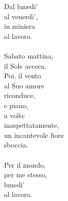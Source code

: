 \begin{haiku}
Dal lunedi' \\
al venerdi',\\
in miniera\\
al lavoro.\\
\leavevmode\\
Sabato mattina,\\
il Sole acceca.\\
Poi, il vento\\
al Suo amore\\
riconduce,\\
e piano,\\
a volte\\
inaspettatamente,\\
un incantevole fiore\\
sboccia.\\
\leavevmode\\
Per il mondo,\\
per me stesso,\\
lunedi'\\
al lavoro.\\
\end{haiku}
\restoregeometry

